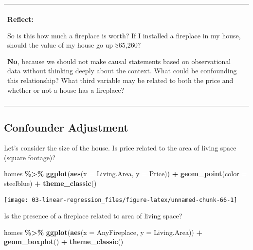 \documentclass[
]{book}
\newenvironment{Shaded}{\begin{snugshade}}{\end{snugshade}}
\newcommand{\AttributeTok}[1]{\textcolor[rgb]{0.13,0.29,0.53}{#1}}
\newcommand{\FunctionTok}[1]{\textcolor[rgb]{0.13,0.29,0.53}{\textbf{#1}}}
\newcommand{\NormalTok}[1]{#1}
\newcommand{\SpecialCharTok}[1]{\textcolor[rgb]{0.81,0.36,0.00}{\textbf{#1}}}
\newcommand{\StringTok}[1]{\textcolor[rgb]{0.31,0.60,0.02}{#1}}
\newenvironment{reflect}
{
    \begin{center}
    
    \begin{tabular}{|p{0.8\textwidth}|}
    \rowcolor{LightBlue}
    \hline\\
    \rowcolor{LightBlue}
    \textbf{Reflect:}
}
{
    \\\rowcolor{LightBlue}
    \\\hline
    \end{tabular} 
    \end{center}
}
\begin{document}
\begin{reflect}
So is this how much a fireplace is worth? If I installed a fireplace in
my house, should the value of my house go up \$65,260?

\textbf{No}, because we should not make causal statements based on
observational data without thinking deeply about the context. What could
be confounding this relationship? What third variable may be related to
both the price and whether or not a house has a fireplace?
\end{reflect}

\subsection{Confounder Adjustment}\label{confounder-adjustment}

Let's consider the size of the house. Is price related to the area of living space (square footage)?

\begin{Shaded}
\begin{Highlighting}[]
\NormalTok{homes }\SpecialCharTok{\%\textgreater{}\%}
    \FunctionTok{ggplot}\NormalTok{(}\FunctionTok{aes}\NormalTok{(}\AttributeTok{x =}\NormalTok{ Living.Area, }\AttributeTok{y =}\NormalTok{ Price)) }\SpecialCharTok{+} 
    \FunctionTok{geom\_point}\NormalTok{(}\AttributeTok{color =} \StringTok{\textquotesingle{}steelblue\textquotesingle{}}\NormalTok{) }\SpecialCharTok{+}
    \FunctionTok{theme\_classic}\NormalTok{()}
\end{Highlighting}
\end{Shaded}

\begin{center}\texttt{[image: 03-linear-regression\_files/figure-latex/unnamed-chunk-66-1]} \end{center}

Is the presence of a fireplace related to area of living space?

\begin{Shaded}
\begin{Highlighting}[]
\NormalTok{homes }\SpecialCharTok{\%\textgreater{}\%}
    \FunctionTok{ggplot}\NormalTok{(}\FunctionTok{aes}\NormalTok{(}\AttributeTok{x =}\NormalTok{ AnyFireplace, }\AttributeTok{y =}\NormalTok{ Living.Area)) }\SpecialCharTok{+} 
    \FunctionTok{geom\_boxplot}\NormalTok{() }\SpecialCharTok{+}
    \FunctionTok{theme\_classic}\NormalTok{()}
\end{Highlighting}
\end{Shaded}
\end{document}
